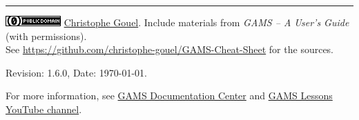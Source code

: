 \documentclass[10pt,landscape,a4paper]{article}
\begin{document}
\begin{multicols}{2}
\vspace{0.5cm}
\rule{3cm}{0.5pt}

\href{http://creativecommons.org/publicdomain/zero/1.0/}{\includegraphics[height=1.75ex]{CC0-small.png}}
\href{https://www.christophegouel.com}{Christophe Gouel}. Include materials from \emph{GAMS -- A User's Guide} (with permissions). \\
See \url{https://github.com/christophe-gouel/GAMS-Cheat-Sheet} for the sources.

Revision: 1.6.0, Date: \today{}.

For more information, see \href{https://www.gams.com/latest/docs/}{GAMS
  Documentation Center} and \href{https://www.youtube.com/user/GAMSLessons}{GAMS
  Lessons YouTube channel}.

\end{multicols}
\end{document}

